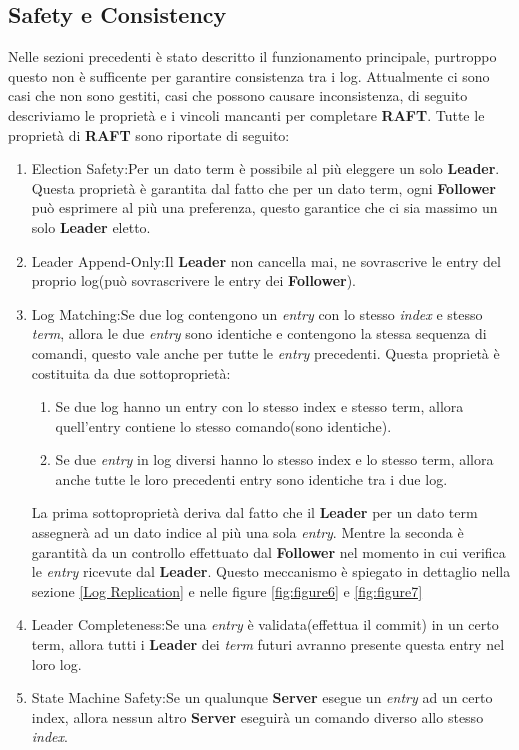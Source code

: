 \subsection{Safety e Consistency}
Nelle sezioni precedenti è stato descritto il funzionamento principale, purtroppo questo non è sufficente per garantire consistenza tra i log.
Attualmente ci sono casi che non sono gestiti, casi che possono causare inconsistenza, di seguito descriviamo le proprietà e i vincoli mancanti per completare \textbf{RAFT}.
Tutte le proprietà di \textbf{RAFT} sono riportate di seguito:
\begin{enumerate}
	\item Election Safety:Per un dato term è possibile al più eleggere un solo \textbf{Leader}.
	Questa proprietà è garantita dal fatto che per un dato term, ogni \textbf{Follower} può esprimere al più una preferenza, questo garantice che ci sia massimo un solo \textbf{Leader} eletto.
	\item Leader Append-Only:Il \textbf{Leader} non cancella mai, ne sovrascrive le entry del proprio log(può sovrascrivere le entry dei \textbf{Follower}).
	\item Log Matching:Se due log contengono un \textit{entry} con lo stesso \textit{index} e stesso \textit{term}, allora le due \textit{entry} sono identiche e contengono la stessa sequenza di comandi, questo vale anche per tutte le \textit{entry} precedenti.
	Questa proprietà è costituita da due sottoproprietà:
	\begin{enumerate}
		\item Se due log hanno un entry con lo stesso index e stesso term, allora quell'entry contiene lo stesso comando(sono identiche).
		\item Se due \textit{entry} in log diversi hanno lo stesso index e lo stesso term, allora anche tutte le loro precedenti entry sono identiche tra i due log.
	\end{enumerate}
	La prima sottoproprietà deriva dal fatto che il \textbf{Leader} per un dato term assegnerà ad un dato indice al più una sola \textit{entry}.
	Mentre la seconda è garantità da un controllo effettuato dal \textbf{Follower} nel momento in cui verifica le \textit{entry} ricevute dal \textbf{Leader}.
	Questo meccanismo è spiegato in dettaglio nella sezione \ref{Log Replication} e nelle figure  \ref{fig:figure6} e \ref{fig:figure7}
	\item Leader Completeness:Se una \textit{entry} è validata(effettua il commit) in un certo term, allora tutti i \textbf{Leader} dei \textit{term} futuri avranno presente questa entry nel loro log.
	\item State Machine Safety:Se un qualunque \textbf{Server} esegue un \textit{entry} ad un certo index, allora nessun altro \textbf{Server} eseguirà un comando diverso allo stesso \textit{index}.
\end{enumerate}
